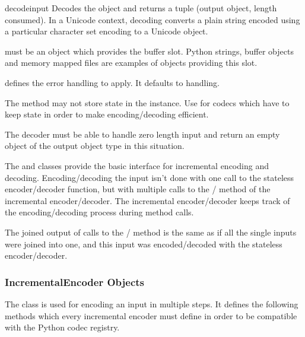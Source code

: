 \begin{methoddesc}{decode}{input}
  Decodes the object  and returns a tuple (output object,
  length consumed).  In a Unicode context, decoding converts a plain string
  encoded using a particular character set encoding to a Unicode object.

   must be an object which provides the 
  buffer slot.  Python strings, buffer objects and memory mapped files
  are examples of objects providing this slot.

   defines the error handling to apply. It defaults to
   handling.

  The method may not store state in the  instance. Use
   for codecs which have to keep state in order to
  make encoding/decoding efficient.

  The decoder must be able to handle zero length input and return an
  empty object of the output object type in this situation.
\end{methoddesc}

The  and  classes provide
the basic interface for incremental encoding and decoding. Encoding/decoding the
input isn't done with one call to the stateless encoder/decoder function,
but with multiple calls to the / method of the
incremental encoder/decoder. The incremental encoder/decoder keeps track of
the encoding/decoding process during method calls.

The joined output of calls to the / method is the
same as if all the single inputs were joined into one, and this input was
encoded/decoded with the stateless encoder/decoder.


\subsubsection{IncrementalEncoder Objects \label{incremental-encoder-objects}}


The  class is used for encoding an input in multiple
steps. It defines the following methods which every incremental encoder must
define in order to be compatible with the Python codec registry.

